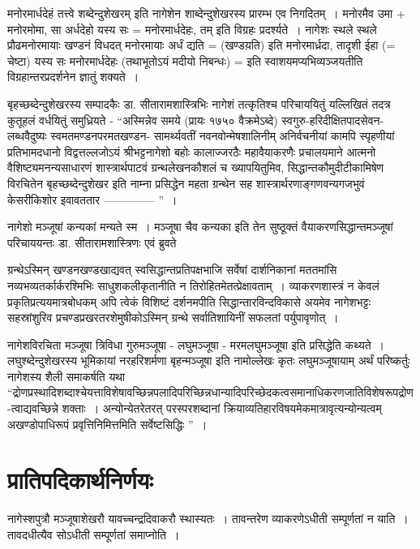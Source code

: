 {मनोरमार्धदेहं तत्त्वे शब्देन्दुशेखरम् इति नागेशेन शाब्देन्दुशेखरस्य प्रारम्भ एव निगदितम्~। मनोरमैव उमा + मनोरमोमा, सा अर्धदेहो यस्य सः = मनोरमार्धदेहः, तम् इति विग्रहः प्रदर्श्यते~। नागेशः स्थले स्थले प्रौढमनोरमायाः खण्डनं विधदत् मनोरमायाः अर्धं द्यति = (खण्डय़ति) इति मनोरमार्ध्रदा, तादृशी ईहा (= चेष्टा) यस्य सः मनोरमार्धदेहः (तथाभूतोऽयं मदीयो निबन्धः) = इति स्वाशयमप्यभिव्यञ्जयतीति विग्रहान्तरप्रदर्शनेन ज्ञातुं शक्यते~। 

बृहच्छब्देन्दुशेखरस्य सम्पादकैः डा. सीतारामशास्त्रिभिः नागेशं तत्कृतिश्च \break परिचाययितुं यल्लिखितं तदत्र कुतूहलं वर्धयितुं समुध्रियते - “अस्मिन्नेव समये (प्रायः १७५० वैक्रमेऽब्दे) स्वगुरु-हरिदीक्षितपादसेवन-लब्धवैदुष्यः स्वमतमण्डनपरमतखण्डन- सामर्थ्यवतीं नवनवोन्मेषशालिनीम् अनिर्वचनीयां कामपि स्पृहणीयां प्रतिभामदधानो विद्वत्तल्लजोऽयं श्रीभट्टनागेशो बहोः कालाज्जरठैः महावैयाकरणैः प्रचालयमाने आत्मनो वैशिष्ट्यमनन्य\-\break साधारणं शास्त्रार्थपाटवं ग्रन्थलेखनकौशलं च ख्यापयितुमिव, सिद्धान्तकौमुदीटीकामिषेण \-विरचितेन बृहच्छब्देन्दुशेखर इति नाम्ना प्रसिद्धेन महता ग्रन्थेन सह शास्त्रार्थरणाङ्गणवन्यगजभुवं केसरीकिशोर इवावततार -------------- ”~। 

नागेशो मञ्जूषां कन्यकां मन्यते स्म~। मञ्जूषा चैव कन्यका इति तेन सुष्ठूक्तं वैयाकरणसिद्धान्तमञ्जूषां परिचाययन्तः डा. सीतारामशास्त्रिणः एवं ब्रुवते 

ग्रन्थेऽस्मिन् खण्डनखण्डखाद्यवत् स्वसिद्धान्तप्रतिपक्षभाजि सर्वेषां दार्शनिकानां मततमांसि नव्यभव्यतर्कार्करश्मिभिः साधुशकलीकृतानीति न तिरोहितमेतत्प्रेक्षावताम्~। व्याकरण\-शास्त्रं न केवलं प्रकृतिप्रत्ययमात्रबोधकम् अपि त्वेकं विशिष्टं दर्शनमपीति सिद्धान्तारविन्द\-विकासे अयमेव नागेशभट्टः सहस्रांशुरिव प्रचण्डप्रखरतरशेमुषीकोऽस्मिन् ग्रन्थे सर्वातिशायिनीं सफलतां पर्युपावृणोत्~। 

नागेशविरचिता मञ्जूषा त्रिविधा  गुरुमञ्जूषा - लघुमञ्जूषा - मरमलघुमञ्जूषा इति प्रसिद्धेति कथ्यते~। लघुश्ब्देन्दुशेखरस्य भूमिकायां नरहरिशर्मणा बृहन्मञ्जूषा इति नामोल्लेखः कृतः लघुमञ्जूषायाम् अर्थं परिष्कर्तुः नागेशस्य शैली समाकर्षति यथा  “द्रोणप्रस्थादिशब्दाश्चेयत्ता\-विशेषावच्छिन्नपलादिपरिच्छिन्नधान्यादिपरिच्छेदकत्वसमानाधिकरणजातिविशेषरूपद्रोण-\break त्वाद्यवच्छिन्ने शक्ताः~। अन्योन्येतरेतरत् परस्परशब्दानां क्रियाव्यतिहारविषयमेकमात्रावृत्यन्योन्यत्वम् अखण्डोपाधिरूपं प्रवृत्तिनिमित्तमिति सर्वेष्टसिद्धिः ”~। 

\section*{प्रातिपदिकार्थनिर्णयः}

नागेस्शपुत्रौ मञ्जूषाशेखरौ यावच्चन्द्रदिवाकरौ स्थास्यतः~। तावन्तरेण व्याकरणेऽधीती सम्पूर्णतां न याति~। तावदधीत्यैव सोऽधीती सम्पूर्णतां समाप्नोति~। 

\articleend
}
